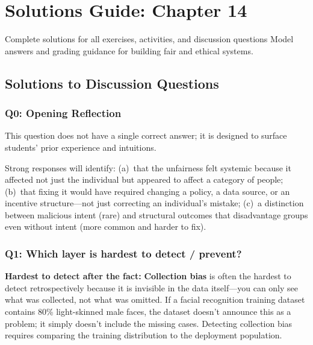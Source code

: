 
\chapter{Solutions Guide: Chapter 14}
\label{ch:solutions-ch14}

\begin{chapterquote}{Complete solutions for all exercises, activities, and discussion questions}
Model answers and grading guidance for building fair and ethical systems.
\end{chapterquote}

\section*{Solutions to Discussion Questions}

\subsection*{Q0: Opening Reflection}

This question does not have a single correct answer; it is designed to surface students' prior experience and intuitions.

Strong responses will identify: (a)~that the unfairness felt systemic because it affected not just the individual but appeared to affect a category of people; (b)~that fixing it would have required changing a policy, a data source, or an incentive structure---not just correcting an individual's mistake; (c)~a distinction between malicious intent (rare) and structural outcomes that disadvantage groups even without intent (more common and harder to fix).

\subsection*{Q1: Which layer is hardest to detect / prevent?}

\textbf{Hardest to detect after the fact:} \textbf{Collection bias} is often the hardest to detect retrospectively because it is invisible in the data itself---you can only see what was collected, not what was omitted. If a facial recognition training dataset contains 80\% light-skinned male faces, the dataset doesn't announce this as a problem; it simply doesn't include the missing cases. Detecting collection bias requires comparing the training distribution to the deployment population.

